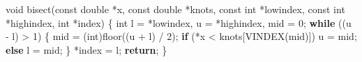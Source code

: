 \documentclass[
  12pt,
  letterpaper,
  DIV=11,
  numbers=noendperiod]{scrreprt}
\newenvironment{Shaded}{\begin{snugshade}}{\end{snugshade}}
\newcommand{\ControlFlowTok}[1]{\textcolor[rgb]{0.00,0.23,0.31}{\textbf{#1}}}
\newcommand{\DataTypeTok}[1]{\textcolor[rgb]{0.68,0.00,0.00}{#1}}
\newcommand{\DecValTok}[1]{\textcolor[rgb]{0.68,0.00,0.00}{#1}}
\newcommand{\NormalTok}[1]{\textcolor[rgb]{0.00,0.23,0.31}{#1}}
\newcommand{\OperatorTok}[1]{\textcolor[rgb]{0.37,0.37,0.37}{#1}}
\theoremstyle{remark}
\begin{document}
\begin{Shaded}
\begin{Highlighting}[]
\DataTypeTok{void}\NormalTok{ bisect}\OperatorTok{(}\DataTypeTok{const} \DataTypeTok{double} \OperatorTok{*}\NormalTok{x}\OperatorTok{,} \DataTypeTok{const} \DataTypeTok{double} \OperatorTok{*}\NormalTok{knots}\OperatorTok{,} \DataTypeTok{const} \DataTypeTok{int} \OperatorTok{*}\NormalTok{lowindex}\OperatorTok{,}
            \DataTypeTok{const} \DataTypeTok{int} \OperatorTok{*}\NormalTok{highindex}\OperatorTok{,} \DataTypeTok{int} \OperatorTok{*}\NormalTok{index}\OperatorTok{)} \OperatorTok{\{}
    \DataTypeTok{int}\NormalTok{ l }\OperatorTok{=} \OperatorTok{*}\NormalTok{lowindex}\OperatorTok{,}\NormalTok{ u }\OperatorTok{=} \OperatorTok{*}\NormalTok{highindex}\OperatorTok{,}\NormalTok{ mid }\OperatorTok{=} \DecValTok{0}\OperatorTok{;}
    \ControlFlowTok{while} \OperatorTok{((}\NormalTok{u }\OperatorTok{{-}}\NormalTok{ l}\OperatorTok{)} \OperatorTok{\textgreater{}} \DecValTok{1}\OperatorTok{)} \OperatorTok{\{}
\NormalTok{        mid }\OperatorTok{=} \OperatorTok{(}\DataTypeTok{int}\OperatorTok{)}\NormalTok{floor}\OperatorTok{((}\NormalTok{u }\OperatorTok{+}\NormalTok{ l}\OperatorTok{)} \OperatorTok{/} \DecValTok{2}\OperatorTok{);}
        \ControlFlowTok{if} \OperatorTok{(*}\NormalTok{x }\OperatorTok{\textless{}}\NormalTok{ knots}\OperatorTok{[}\NormalTok{VINDEX}\OperatorTok{(}\NormalTok{mid}\OperatorTok{)])}
\NormalTok{            u }\OperatorTok{=}\NormalTok{ mid}\OperatorTok{;}
        \ControlFlowTok{else}
\NormalTok{            l }\OperatorTok{=}\NormalTok{ mid}\OperatorTok{;}
    \OperatorTok{\}}
    \OperatorTok{*}\NormalTok{index }\OperatorTok{=}\NormalTok{ l}\OperatorTok{;}
    \ControlFlowTok{return}\OperatorTok{;}
\OperatorTok{\}}


\end{Highlighting}
\end{Shaded}
\end{document}
